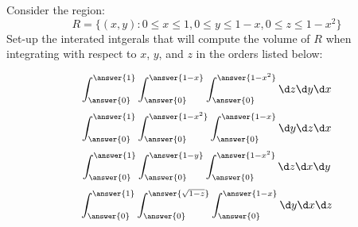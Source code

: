 \documentclass{ximera}
\author{Bart Snapp}
\begin{document}
\begin{exercise}
  Consider the region:
  \[
  R=\{(x,y): 0\le x\le 1, 0\le y\le 1-x, 0\le z\le 1-x^2\}
  \]
  Set-up the interated intgerals that will compute the volume of $R$
  when integrating with respect to $x$, $y$, and $z$ in the orders listed below:
  \begin{prompt}
    \[
    \int_{\answer{0}}^{\answer{1}} \int_{\answer{0}}^{\answer{1-x}} \int_{\answer{0}}^{\answer{1-x^2}}\d z \d y \d x
    \]
    \[
    \int_{\answer{0}}^{\answer{1}} \int_{\answer{0}}^{\answer{1-x^2}} \int_{\answer{0}}^{\answer{1-x}}\d y \d z \d x
    \]
    \[
    \int_{\answer{0}}^{\answer{1}} \int_{\answer{0}}^{\answer{1-y}} \int_{\answer{0}}^{\answer{1-x^2}}\d z \d x \d y
    \]
    \[
    \int_{\answer{0}}^{\answer{1}} \int_{\answer{0}}^{\answer{\sqrt{1-z}}}\int_{\answer{0}}^{\answer{1-x}}\d y \d x \d z
    \]
  \end{prompt}
\end{exercise}
\end{document}
